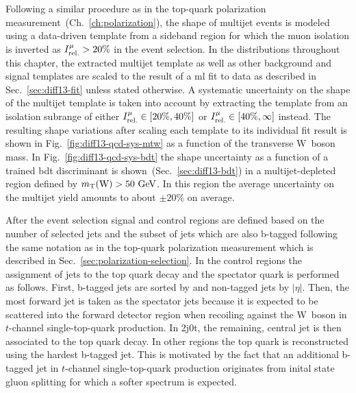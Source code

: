 Following a similar procedure as in the top-quark polarization measurement~(Ch.~\ref{ch:polarization}), the shape of multijet events is modeled using a data-driven template from a sideband region for which the muon isolation is inverted as $I_\textrm{rel.}^{\mu}>20\%$ in the event selection. In the distributions throughout this chapter, the extracted multijet template as well as other background and signal templates are scaled to the result of a \gls{ml} fit to data as described in Sec.~\ref{sec:diff13-fit} unless stated otherwise. A systematic uncertainty on the shape of the multijet template is taken into account by extracting the template from an isolation subrange of either $I_\textrm{rel.}^{\mu}\in[20\%,40\%]$ or $I_\textrm{rel.}^{\mu}\in[40\%,\infty]$ instead. The resulting shape variations after scaling each template to its individual fit result is shown in Fig.~\ref{fig:diff13-qcd-sys-mtw} as a function of the transverse W~boson mass. In Fig.~\ref{fig:diff13-qcd-sys-bdt} the shape uncertainty as a function of a trained \gls{bdt} discriminant is shown~(Sec.~\ref{sec:diff13-bdt}) in a multijet-depleted region defined by $m_{\textrm{T}}(\textrm{W})>50~\textrm{GeV}$. In this region the average uncertainty on the multijet yield amounts to about $\pm20\%$ on average.



After the event selection signal and control regions are defined based on the number of selected jets and the subset of jets which are also b-tagged following the same notation as in the top-quark polarization measurement which is described in Sec.~\ref{sec:polarization-selection}. In the control regions the assignment of jets to the top quark decay and the spectator quark is performed as follows. First, b-tagged jets are sorted by \pt and non-tagged jets by $|\eta|$. Then, the most forward jet is taken as the spectator jets because it is expected to be scattered into the forward detector region when recoiling against the W~boson in $t$-channel single-top-quark production. In 2j0t, the remaining, central jet is then associated to the top quark decay. In other regions the top quark is reconstructed using the hardest b-tagged jet. This is motivated by the fact that an additional b-tagged jet in $t$-channel single-top-quark production originates from inital state gluon splitting for which a softer spectrum is expected.


